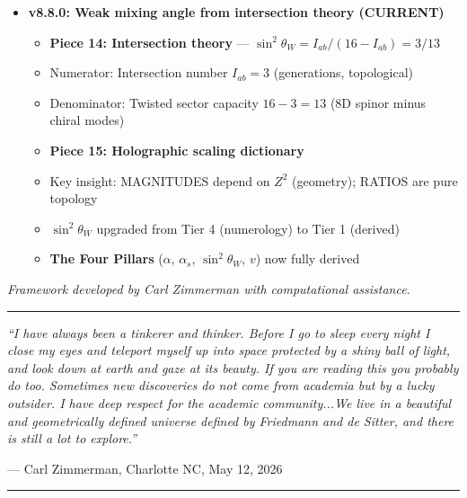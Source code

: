 \documentclass[12pt,a4paper]{article}
\newcommand{\sinW}{\sin^2\theta_W}
\newcommand{\Zsq}{Z^2}
\begin{document}
\begin{itemize}[itemsep=0pt]
\begin{itemize}[itemsep=0pt]
        \item The Three Pillars ($\alpha$, $\alpha_s$, $v$) fully derived from $\Zsq = 32\pi/3$
    \end{itemize}
    \item \textbf{v8.8.0: Weak mixing angle from intersection theory (CURRENT)}
    \begin{itemize}[itemsep=0pt]
        \item \textbf{Piece 14: Intersection theory} --- $\sinW = I_{ab}/(16 - I_{ab}) = 3/13$
        \item Numerator: Intersection number $I_{ab} = 3$ (generations, topological)
        \item Denominator: Twisted sector capacity $16 - 3 = 13$ (8D spinor minus chiral modes)
        \item \textbf{Piece 15: Holographic scaling dictionary}
        \item Key insight: MAGNITUDES depend on $\Zsq$ (geometry); RATIOS are pure topology
        \item $\sinW$ upgraded from Tier 4 (numerology) to Tier 1 (derived)
        \item \textbf{The Four Pillars} ($\alpha$, $\alpha_s$, $\sinW$, $v$) now fully derived
    \end{itemize}
\end{itemize}

\vspace{1em}
\textit{Framework developed by Carl Zimmerman with computational assistance.}

\vspace{3em}
\begin{center}
\rule{0.8\textwidth}{0.4pt}
\vspace{1em}

\emph{``I have always been a tinkerer and thinker. Before I go to sleep every night I close my eyes and teleport myself up into space protected by a shiny ball of light, and look down at earth and gaze at its beauty. If you are reading this you probably do too. Sometimes new discoveries do not come from academia but by a lucky outsider. I have deep respect for the academic community...We live in a beautiful and geometrically defined universe defined by Friedmann and de Sitter, and there is still a lot to explore.''}

\vspace{0.5em}
--- Carl Zimmerman, Charlotte NC, May 12, 2026

\vspace{1em}
\rule{0.8\textwidth}{0.4pt}
\end{center}
\end{document}
